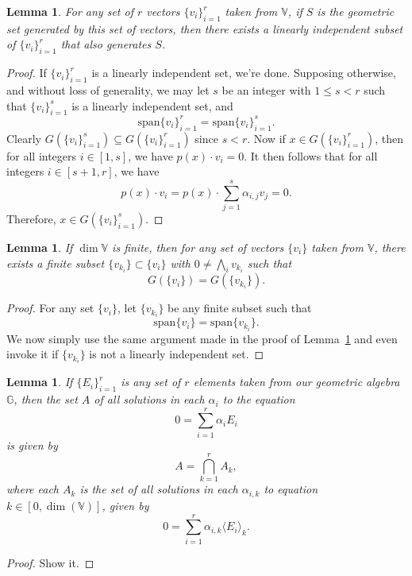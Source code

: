 \documentclass{birkjour}
\newtheorem{lem}[thm]{Lemma}
\theoremstyle{definition}
\theoremstyle{remark}
\numberwithin{equation}{section}
\newcommand{\G}{\mathbb{G}}
\newcommand{\V}{\mathbb{V}}
\begin{document}
\begin{lem}\label{lem_reduce_vec_set}
For any set of $r$ vectors $\{v_i\}_{i=1}^r$ taken from $\V$, if $S$ is the geometric set generated by
this set of vectors, then there exists a linearly independent subset of $\{v_i\}_{i=1}^r$ that also generates $S$.
\end{lem}
\begin{proof}
If $\{v_i\}_{i=1}^r$ is a linearly independent set, we're done.  Supposing otherwise, and without loss of generality,
we may let $s$ be an integer with $1\leq s<r$ such that $\{v_i\}_{i=1}^s$ is a linearly independent set, and
\begin{equation*}
\mbox{span}\{v_i\}_{i=1}^r = \mbox{span}\{v_i\}_{i=1}^s.
\end{equation*}
Clearly $G(\{v_i\}_{i=1}^s)\subseteq G(\{v_i\}_{i=1}^r)$ since $s<r$.
Now if $x\in G(\{v_i\}_{i=1}^r)$, then for all integers $i\in[1,s]$, we have $p(x)\cdot v_i=0$.
It then follows that for all integers $i\in[s+1,r]$, we have
\begin{equation*}
p(x)\cdot v_i = p(x)\cdot\sum_{j=1}^s\alpha_{i,j}v_j = 0.
\end{equation*}
Therefore, $x\in G(\{v_i\}_{i=1}^s)$.
\end{proof}

\begin{lem}\label{lem_reduce_inf_vec_set}
If $\dim\V$ is finite, then for any set of vectors $\{v_i\}$ taken from $\V$, there exists a finite subset $\{v_{k_i}\}\subset\{v_i\}$
with $0\neq\bigwedge_i v_{k_i}$ such that
\begin{equation*}
G(\{v_i\}) = G(\{v_{k_i}\}).
\end{equation*}
\end{lem}
\begin{proof}
For any set $\{v_i\}$, let $\{v_{k_i}\}$ be any finite subset such that
\begin{equation*}
\mbox{span}\{v_i\} = \mbox{span}\{v_{k_i}\}.
\end{equation*}
We now simply use the same argument made in the proof of Lemma~\ref{lem_reduce_vec_set}
and even invoke it if $\{v_{k_i}\}$ is not a linearly independent set.
\end{proof}

\begin{lem}\label{lem_solution_intersection}
If $\{E_i\}_{i=1}^r$ is any set of $r$ elements taken from our geometric algebra $\G$, then the set $A$ of all solutions in each $\alpha_i$
to the equation
\begin{equation*}
0 = \sum_{i=1}^r\alpha_i E_i
\end{equation*}
is given by
\begin{equation*}
A = \bigcap_{k=1}^r A_k,
\end{equation*}
where each $A_k$ is the set of all solutions in each $\alpha_{i,k}$ to equation $k\in[0,\dim(\V)]$, given by
\begin{equation*}
0 = \sum_{i=1}^r\alpha_{i,k}\langle E_i\rangle_k.
\end{equation*}
\end{lem}
\begin{proof}
Show it.
\end{proof}
\end{document}
